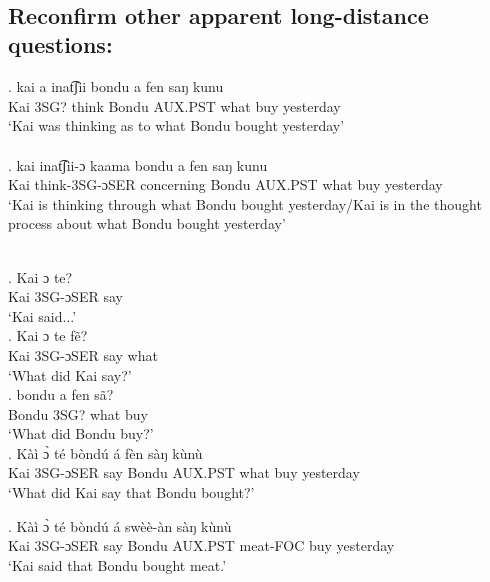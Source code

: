 \documentclass{assets/fieldnotes}
\begin{document}
\\


\subsection{Reconfirm other apparent long-distance questions:}

\exg. kai a inat͡ʃii bondu a fen saŋ kunu\\
Kai 3SG? think Bondu AUX.PST what buy yesterday\\
`Kai was thinking as to what Bondu bought yesterday' \\

\\



\exg. kai inat͡ʃii-ɔ kaama bondu a fen saŋ kunu\\
Kai think-3SG-ɔSER concerning Bondu AUX.PST what buy yesterday\\
`Kai is thinking through what Bondu bought yesterday/Kai is in the thought process about what Bondu bought yesterday'\\

\\



\exg. Kai ɔ te?\\
Kai 3SG-ɔSER say\\
`Kai said...' \\

\exg. Kai ɔ te fẽ?\\
Kai 3SG-ɔSER say what\\
`What did Kai say?'  \\

\exg. bondu a fen sã?\\
Bondu 3SG? what buy \\
`What did Bondu buy?' \\


\exg. Kàì ɔ̀ té bòndú á fèn sàŋ kùnù\\
Kai 3SG-ɔSER say Bondu AUX.PST what buy yesterday\\
`What did Kai say that Bondu bought?'\\



\exg. Kàì ɔ̀ té bòndú á swèè-àn sàŋ kùnù\\
Kai 3SG-ɔSER say Bondu AUX.PST meat-FOC buy yesterday\\
`Kai said that Bondu bought meat.'\\

\end{document}
